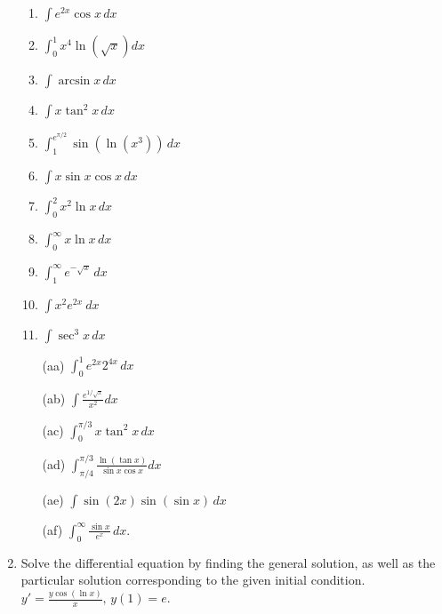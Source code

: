 \documentclass[letterpaper]{article}
\begin{document}
\begin{enumerate}
\begin{enumerate}
	\item $\int e^{2x} \cos x \,dx$

	\item $\int_0^1 x^4 \ln(\sqrt x) dx$

	\item $\int \arcsin x \, dx$

	\item $\int x \tan^2 x\,dx$

	\item $\int_1^{e^{\pi/2}} \sin (\ln (x^3))\,dx$

	\item $\int x \sin x \cos x\,dx$

	\item $\int_0^2 x^2 \ln x\,dx$

	\item $\int_0^\infty x\ln x\,dx$

	\item $\int_1^\infty e^{-\sqrt x}\,dx$

	\item $\int x^2 e^{2x}~dx$

	\item $\int \sec^3 x\,dx$

	\item[(aa)] $\int_0^1 e^{2x}2^{4x}\,dx$

	\item[(ab)] $\int \frac{e^{1/\sqrt{x}}}{x^2}dx$

	\item[(ac)] $\int_0^{\pi/3} x\tan^2 x\,dx$

	\item[(ad)] $\int_{\pi/4}^{\pi/3} \frac{\ln(\tan x)}{\sin x \cos x}dx$

	\item[(ae)] $\int \sin(2x)\sin(\sin x)\,dx$

	\item[(af)] $\int_0^\infty \frac{\sin x}{e^x}\,dx$.
	\end{enumerate}


\item Solve the differential equation by finding the general solution, as well as the particular solution corresponding to the given initial condition.
	$y'=\frac{y\cos (\ln x)}{x},\,y(1)=e$.

\end{enumerate}
\end{document}
